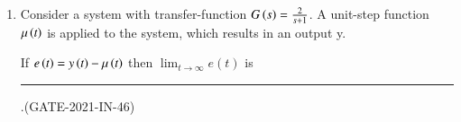 \begin{enumerate}[label=\thechapter.\arabic*,ref=\thechapter.\theenumi]
\item 
Consider a system with transfer-function $G\left(s\right)=\frac{2}{s+1}$. A unit-step function $\mu\left(t\right)$ is applied to the system, which results in an output y. 

If $e\left(t\right)=y\left(t\right)-\mu\left(t\right)$ then $ \lim_{t\to\infty} e(t)$ is\rule{1.5cm}{0.15mm}.\hfill(GATE-2021-IN-46)\\
\solution

\pagebreak
\end{enumerate}